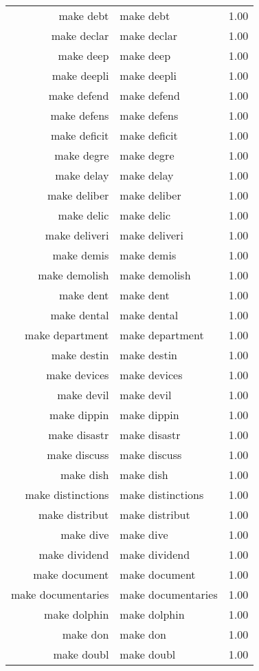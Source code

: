 \begin{table}[ht]
\begin{tabular}{rlr}
  make debt & make debt & 1.00 \\ 
  make declar & make declar & 1.00 \\ 
  make deep & make deep & 1.00 \\ 
  make deepli & make deepli & 1.00 \\ 
  make defend & make defend & 1.00 \\ 
  make defens & make defens & 1.00 \\ 
  make deficit & make deficit & 1.00 \\ 
  make degre & make degre & 1.00 \\ 
  make delay & make delay & 1.00 \\ 
  make deliber & make deliber & 1.00 \\ 
  make delic & make delic & 1.00 \\ 
  make deliveri & make deliveri & 1.00 \\ 
  make demis & make demis & 1.00 \\ 
  make demolish & make demolish & 1.00 \\ 
  make dent & make dent & 1.00 \\ 
  make dental & make dental & 1.00 \\ 
  make department & make department & 1.00 \\ 
  make destin & make destin & 1.00 \\ 
  make devices & make devices & 1.00 \\ 
  make devil & make devil & 1.00 \\ 
  make dippin & make dippin & 1.00 \\ 
  make disastr & make disastr & 1.00 \\ 
  make discuss & make discuss & 1.00 \\ 
  make dish & make dish & 1.00 \\ 
  make distinctions & make distinctions & 1.00 \\ 
  make distribut & make distribut & 1.00 \\ 
  make dive & make dive & 1.00 \\ 
  make dividend & make dividend & 1.00 \\ 
  make document & make document & 1.00 \\ 
  make documentaries & make documentaries & 1.00 \\ 
  make dolphin & make dolphin & 1.00 \\ 
  make don & make don & 1.00 \\ 
  make doubl & make doubl & 1.00 \\ 

\end{tabular}
\end{table}

